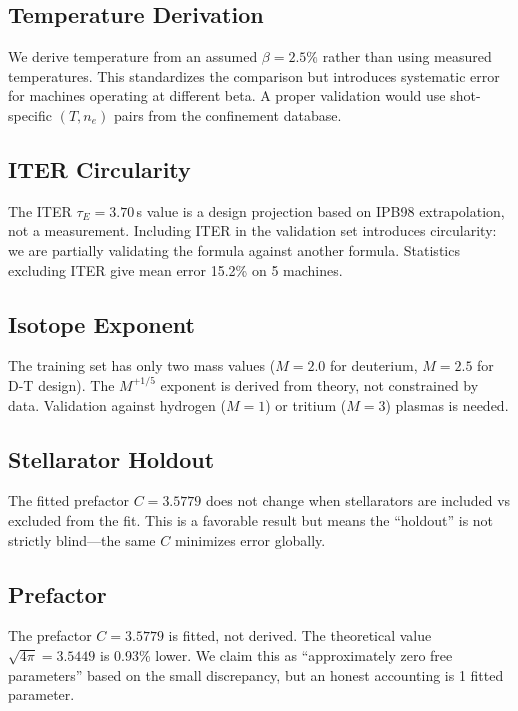 \documentclass[11pt,letterpaper]{article}
\newcommand{\tauE}{\tau_E}
\begin{document}
\subsection{Temperature Derivation}

We derive temperature from an assumed $\beta = 2.5\%$ rather than using measured temperatures. This standardizes the comparison but introduces systematic error for machines operating at different beta. A proper validation would use shot-specific $(T, n_e)$ pairs from the confinement database.

\subsection{ITER Circularity}

The ITER $\tauE = 3.70$\,s value is a design projection based on IPB98 extrapolation, not a measurement. Including ITER in the validation set introduces circularity: we are partially validating the formula against another formula. Statistics excluding ITER give mean error 15.2\% on 5 machines.

\subsection{Isotope Exponent}

The training set has only two mass values ($M = 2.0$ for deuterium, $M = 2.5$ for D-T design). The $M^{+1/5}$ exponent is derived from theory, not constrained by data. Validation against hydrogen ($M = 1$) or tritium ($M = 3$) plasmas is needed.

\subsection{Stellarator Holdout}

The fitted prefactor $C = 3.5779$ does not change when stellarators are included vs excluded from the fit. This is a favorable result but means the ``holdout'' is not strictly blind---the same $C$ minimizes error globally.

\subsection{Prefactor}

The prefactor $C = 3.5779$ is fitted, not derived. The theoretical value $\sqrt{4\pi} = 3.5449$ is 0.93\% lower. We claim this as ``approximately zero free parameters'' based on the small discrepancy, but an honest accounting is 1 fitted parameter.
\end{document}
